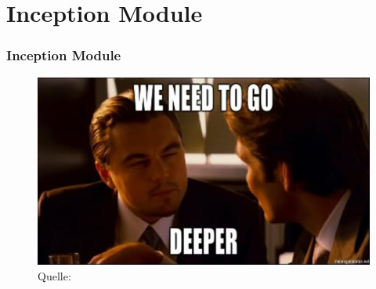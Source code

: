 \documentclass{beamer}
\begin{document}
\section{Inception Module}

\begin{frame}
	\frametitle{Inception Module}
	\begin{figure}
		\includegraphics[width=0.8\linewidth]{images/inception_meme.jpg}\\
		\hspace*{0pt}\hbox{\scriptsize Quelle:}
		\label{fig:inception_meme}
	\end{figure}
	
\end{frame}
\end{document}
